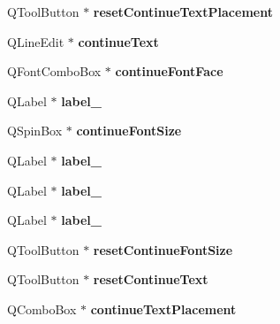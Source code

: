 \begin{DoxyCompactItemize}
Q\+Tool\+Button $\ast$ {\bfseries reset\+Continue\+Text\+Placement}
\item 
\mbox{\label{class_ui___inspector_text_line_ac181de4bbcacb2130f9e684240dc721a}} 
Q\+Line\+Edit $\ast$ {\bfseries continue\+Text}
\item 
\mbox{\label{class_ui___inspector_text_line_a2110e4d567b3c3628b5d341fa64b75fc}} 
Q\+Font\+Combo\+Box $\ast$ {\bfseries continue\+Font\+Face}
\item 
\mbox{\label{class_ui___inspector_text_line_a68a5a5bee1af839a11a87f947a7fb1df}} 
Q\+Label $\ast$ {\bfseries label\+\_}
\item 
\mbox{\label{class_ui___inspector_text_line_ae1f4a286bded2997abba4a3345587ad9}} 
Q\+Spin\+Box $\ast$ {\bfseries continue\+Font\+Size}
\item 
\mbox{\label{class_ui___inspector_text_line_a78d1e33bd64c98b49679ce80e0c0980c}} 
Q\+Label $\ast$ {\bfseries label\+\_}
\item 
\mbox{\label{class_ui___inspector_text_line_a717ac6631ed10dc5ffc8ff8c94a7e64d}} 
Q\+Label $\ast$ {\bfseries label\+\_}
\item 
\mbox{\label{class_ui___inspector_text_line_a83b6d868f69d6dcd3ec1278751770e40}} 
Q\+Label $\ast$ {\bfseries label\+\_}
\item 
\mbox{\label{class_ui___inspector_text_line_a4f8bcf0bb3db9727e6229461e563452f}} 
Q\+Tool\+Button $\ast$ {\bfseries reset\+Continue\+Font\+Size}
\item 
\mbox{\label{class_ui___inspector_text_line_a40366a3949f584cf2bfa0d136a900a60}} 
Q\+Tool\+Button $\ast$ {\bfseries reset\+Continue\+Text}
\item 
\mbox{\label{class_ui___inspector_text_line_ab2004be692f602b4a62a26ba38904829}} 
Q\+Combo\+Box $\ast$ {\bfseries continue\+Text\+Placement}

\end{DoxyCompactItemize}
